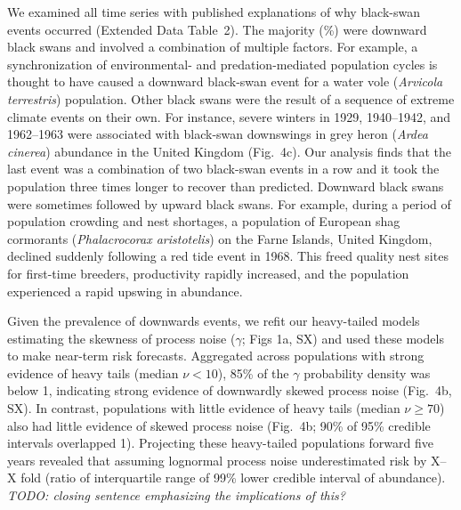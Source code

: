 We examined all time series with published explanations of why black-swan events occurred (Extended Data Table~2). The majority (\percBSDown \%) were downward black swans and involved a combination of multiple factors. For example, a synchronization of environmental- and predation-mediated population cycles is thought to have caused a downward black-swan event for a water vole (\emph{Arvicola terrestris}) population\cite{saucy1994}. Other black swans were the result of a sequence of extreme climate events on their own. For instance, severe winters in 1929, 1940--1942, and 1962--1963 were associated with black-swan downswings in grey heron (\emph{Ardea cinerea}) abundance in the United Kingdom\cite{stafford1971} (Fig.~4c). Our analysis finds that the last event was a combination of two black-swan events in a row and it took the population three times longer to recover than predicted\cite{stafford1971}. Downward black swans were sometimes followed by upward black swans. For example, during a period of population crowding and nest shortages, a population of European shag cormorants (\emph{Phalacrocorax aristotelis}) on the Farne Islands, United Kingdom, declined suddenly following a red tide event in 1968\cite{potts1980}. This freed quality nest sites for first-time breeders, productivity rapidly increased, and the population experienced a rapid upswing in abundance\cite{potts1980}.

Given the prevalence of downwards events, we refit our heavy-tailed models estimating the skewness of process noise (\(\gamma\); Figs 1a, SX) and used these models to make near-term risk forecasts. Aggregated across populations with strong evidence of heavy tails (median \(\nu < 10\)), 85\% of the \(\gamma\) probability density was below 1, indicating strong evidence of downwardly skewed process noise (Fig.~4b, SX). In contrast, populations with little evidence of heavy tails (median \(\nu \geq 70\)) also had little evidence of skewed process noise (Fig.~4b; 90\% of 95\% credible intervals overlapped 1). Projecting these heavy-tailed populations forward five years revealed that assuming lognormal process noise underestimated risk by X--X fold (ratio of interquartile range of 99\% lower credible interval of abundance). \emph{TODO: closing sentence emphasizing the implications of this?}

